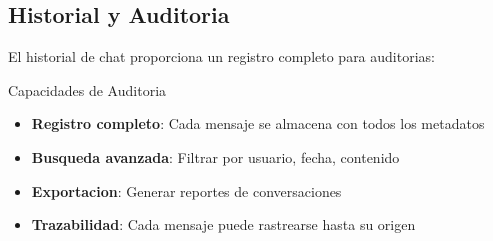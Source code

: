 
\subsection{Historial y Auditoria}

El historial de chat proporciona un registro completo para auditorias:

\begin{caja}{Capacidades de Auditoria}
\begin{itemize}
\item \textbf{Registro completo}: Cada mensaje se almacena con todos los metadatos
\item \textbf{Busqueda avanzada}: Filtrar por usuario, fecha, contenido
\item \textbf{Exportacion}: Generar reportes de conversaciones
\item \textbf{Trazabilidad}: Cada mensaje puede rastrearse hasta su origen
\end{itemize}
\end{caja}

